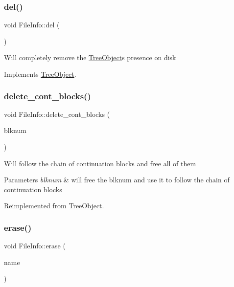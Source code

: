 \subsubsection{\texorpdfstring{del()}{del()}}
{\footnotesize\ttfamily void File\+Info\+::del (\begin{DoxyParamCaption}{ }\end{DoxyParamCaption})\hspace{0.3cm}{\ttfamily [virtual]}}

Will completely remove the \mbox{\hyperlink{classTreeObject}{Tree\+Object}}\textquotesingle{}s presence on disk 

Implements \mbox{\hyperlink{classTreeObject_af390b7479aa972888e594c07a85740b6}{Tree\+Object}}.

\mbox{\label{classFileInfo_a8c6b58cb9f7e9978064291ef81380e01}} 
\subsubsection{\texorpdfstring{delete\+\_\+cont\+\_\+blocks()}{delete\_cont\_blocks()}}
{\footnotesize\ttfamily void File\+Info\+::delete\+\_\+cont\+\_\+blocks (\begin{DoxyParamCaption}\item[{Blk\+Num\+Type}]{blknum }\end{DoxyParamCaption})\hspace{0.3cm}{\ttfamily [virtual]}}

Will follow the chain of continuation blocks and free all of them 
\begin{DoxyParams}{Parameters}
{\em blknum} & will free the blknum and use it to follow the chain of continuation blocks \\
\hline
\end{DoxyParams}


Reimplemented from \mbox{\hyperlink{classTreeObject_a07f5f5de1cff0cfdc2372e81559f5181}{Tree\+Object}}.

\mbox{\label{classFileInfo_ae058242283d3317eaf2b79428e6137f6}} 
\subsubsection{\texorpdfstring{erase()}{erase()}}
{\footnotesize\ttfamily void File\+Info\+::erase (\begin{DoxyParamCaption}\item[{string}]{name }\end{DoxyParamCaption})\hspace{0.3cm}{\ttfamily [virtual]}}

